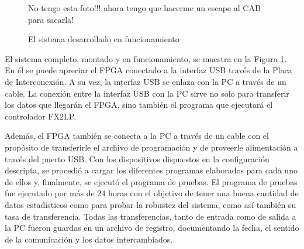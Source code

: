 \begin{figure}[t]
	\centering
	No tengo esta foto!!! ahora tengo que hacerme un escape al CAB para sacarla!
	\caption{El sistema desarrollado en funcionamiento}
	\label{test:todo}
\end{figure}

El sistema completo, montado y en funcionamiento, se muestra en la Figura \ref{test:todo}. En él se puede apreciar el FPGA conectado a la interfaz USB través de la Placa de Interconexión. A su vez, la interfaz USB se enlaza con la PC a través de un cable. La conexión entre la interfaz USB con la PC sirve no solo para transferir los datos que llegarán el FPGA, sino también el programa que ejecutará el controlador FX2LP.

Además, el FPGA también se conecta a la PC a través de un cable con el propósito de transferirle el archivo de programación y de proveerle alimentación a través del puerto USB.
Con los dispositivos dispuestos en la configuración descripta, se procedió a cargar los diferentes programas elaborados para cada uno de ellos y, finalmente, se ejecutó el programa de pruebas.
El programa de pruebas fue ejecutado por más de 24 horas con el objetivo de tener una buena cantidad de datos estadísticos como para probar la robustez del sistema, como así también su tasa de transferencia.
Todas las transferencias, tanto de entrada como de salida a la PC fueron guardas en un archivo de registro, documentando la fecha, el sentido de la comunicación y los datos intercambiados. 